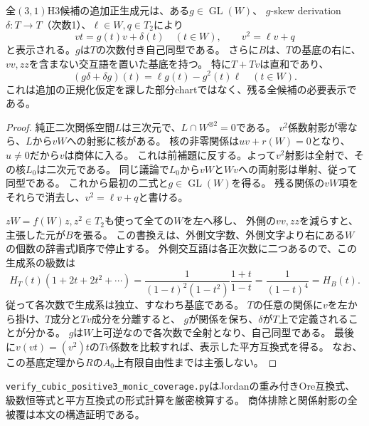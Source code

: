 \begin{theorem}[全候補を覆うmonic正規化表示]
\label{thm:h3-positive3-monic-coverage}
全$(3,1)$H3候補の追加正生成元は、ある$g\in\operatorname{GL}(W)$、
$g$-skew derivation $\delta:T\to T$（次数1）、$\ell\in W,q\in T_2$により
\[
 vt=g(t)v+\delta(t)\quad(t\in W),\qquad v^2=\ell v+q
\]
と表示される。$g$は$T$の次数付き自己同型である。
さらに$B$は、$T$の基底の右に、$vv,zz$を含まない交互語を置いた基底を持つ。
特に$T+Tv$は直和であり、
\[
 (g\delta+\delta g)(t)=\ell g(t)-g^2(t)\ell\quad(t\in W).
\]
これは追加の正規化仮定を課した部分chartではなく、残る全候補の必要表示である。
\end{theorem}
\begin{proof}
純正二次関係空間$L$は三次元で、$L\cap W^{\otimes2}=0$である。
$v^2$係数射影が零なら、$L$から$vW$への射影に核がある。
核の非零関係は$uv+r(W)=0$となり、$u\ne0$だから$v$は商体に入る。
これは前補題に反する。よって$v^2$射影は全射で、その核$L_0$は二次元である。
同じ議論で$L_0$から$vW$と$Wv$への両射影は単射、従って同型である。
これから最初の二式と$g\in\operatorname{GL}(W)$を得る。
残る関係の$vW$項をそれらで消去し、$v^2=\ell v+q$と書ける。

$zW=f(W)z,z^2\in T_2$も使って全ての$W$を左へ移し、
外側の$vv,zz$を減らすと、主張した元が$B$を張る。
この書換えは、外側文字数、外側文字より右にある$W$の個数の辞書式順序で停止する。
外側交互語は各正次数に二つあるので、この生成系の級数は
\[
 H_T(t)\left(1+2t+2t^2+\cdots\right)
 =\frac1{(1-t)^2(1-t^2)}\frac{1+t}{1-t}
 =\frac1{(1-t)^4}=H_B(t).
\]
従って各次数で生成系は独立、すなわち基底である。
$T$の任意の関係に$v$を左から掛け、$T$成分と$Tv$成分を分離すると、
$g$が関係を保ち、$\delta$が$T$上で定義されることが分かる。
$g$は$W$上可逆なので各次数で全射となり、自己同型である。
最後に$v(vt)=(v^2)t$の$Tv$係数を比較すれば、表示した平方互換式を得る。
なお、この基底定理から$R$の$A_0$上有限自由性までは主張しない。
\end{proof}

\texttt{verify\_cubic\_positive3\_monic\_coverage.py}はJordanの重み付きOre互換式、
級数恒等式と平方互換式の形式計算を厳密検算する。
商体排除と関係射影の全被覆は本文の構造証明である。
